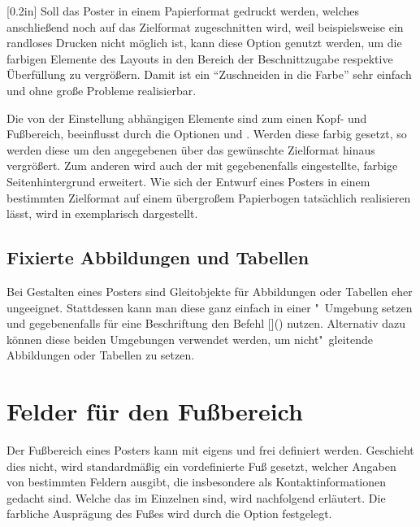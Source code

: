 \begin{Bundle*}[v2.05]{}
\begin{Declaration}{}[0.2in]
\printdeclarationlist%
%
%
%
Soll das Poster in einem Papierformat gedruckt werden, welches anschließend 
noch auf das Zielformat zugeschnitten wird, weil beispielsweise ein randloses 
Drucken nicht möglich ist, kann diese Option genutzt werden, um die farbigen 
Elemente des Layouts in den Bereich der Beschnittzugabe respektive Überfüllung 
zu vergrößern. Damit ist ein \enquote{Zuschneiden in die Farbe} sehr einfach 
und ohne große Probleme realisierbar.

Die von der Einstellung  abhängigen 
Elemente sind zum einen Kopf- und Fußbereich, beeinflusst durch die Optionen 
 und . Werden diese farbig gesetzt, so werden 
diese um den angegebenen  über das gewünschte Zielformat 
hinaus vergrößert. Zum anderen wird auch der mit  
gegebenenfalls eingestellte, farbige Seitenhintergrund erweitert. Wie sich der 
Entwurf eines Posters in einem bestimmten Zielformat auf einem übergroßem 
Papierbogen tatsächlich realisieren lässt, wird in  
exemplarisch dargestellt.
\end{Declaration}



\subsection{Fixierte Abbildungen und Tabellen}

\begin{Declaration}[v2.06f]{}
\begin{Declaration}[v2.06f]{}
\printdeclarationlist%
%
Bei Gestalten eines Posters sind Gleitobjekte für Abbildungen oder Tabellen 
eher ungeeignet. Stattdessen kann man diese ganz einfach in einer 
"~Umgebung setzen und gegebenenfalls für eine 
Beschriftung den Befehl %
[]() nutzen. 
Alternativ dazu können diese beiden Umgebungen verwendet werden, um 
nicht"~gleitende Abbildungen oder Tabellen zu setzen.
\end{Declaration}
\end{Declaration}



\section{Felder für den Fußbereich}
%
%
Der Fußbereich eines Posters kann mit  eigens und frei 
definiert werden. Geschieht dies nicht, wird standardmäßig ein vordefinierte 
Fuß gesetzt, welcher Angaben von bestimmten Feldern ausgibt, die insbesondere 
als Kontaktinformationen gedacht sind. Welche das im Einzelnen sind, wird 
nachfolgend erläutert. Die farbliche Ausprägung des Fußes wird durch die Option
 festgelegt.


\end{Bundle*}
